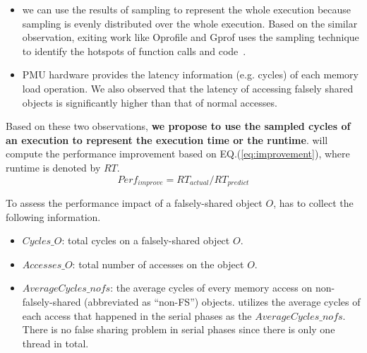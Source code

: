 \begin{itemize}
\item we can use the results of sampling to represent the whole execution because sampling is evenly distributed over the whole execution. Based on the similar observation, exiting work like Oprofile and Gprof uses the sampling technique to identify the hotspots of function calls and code~\cite{oprofile, DBLP:conf/sigplan/GrahamKM82}.

\item PMU hardware provides the latency information (e.g. cycles) of each memory load operation. We also observed that the latency of accessing falsely shared objects is significantly higher than that of normal accesses. 

\end{itemize}

Based on these two observations, {\bf we propose to use the sampled cycles of an execution to represent the execution time or the runtime}. \cheetah{} will compute the performance improvement based on EQ.(\ref{eq:improvement}), where runtime is denoted by $RT$.
\begin{equation}
\label{eq:improvement}
Perf_{improve}=RT_{actual}/RT_{predict}
\end{equation}




To assess the performance impact of a falsely-shared object $O$, \cheetah{} has to collect the following information. 
 
\begin{itemize}
\item $Cycles\_O$: total cycles on a falsely-shared object $O$.
\item $Accesses\_O$: total number of accesses on the object $O$.  
\item $AverageCycles\_{nofs}$: the average cycles of every memory access on non-falsely-shared (abbreviated as ``non-FS'') objects. \cheetah{} utilizes the average cycles of each access that happened in the serial phases as the $AverageCycles\_{nofs}$. There is no false sharing problem in serial phases since there is only one thread in total.  

\end{itemize}

